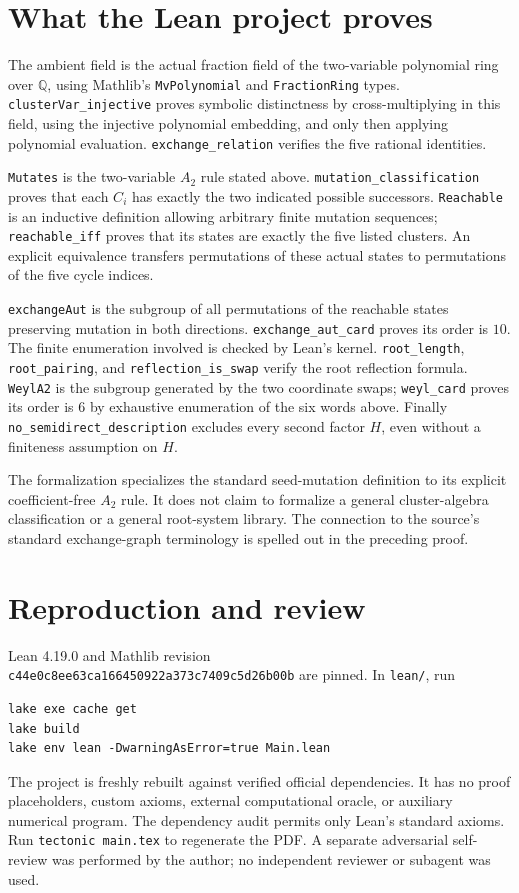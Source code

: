 \documentclass[11pt]{article}
\begin{document}
\newpage
\section*{What the Lean project proves}
The ambient field is the actual fraction field of the two-variable
polynomial ring over $\mathbb Q$, using Mathlib's
\texttt{MvPolynomial} and \texttt{FractionRing} types.
\texttt{clusterVar\_injective} proves symbolic distinctness by
cross-multiplying in this field, using the injective polynomial
embedding, and only then applying polynomial evaluation.
\texttt{exchange\_relation} verifies the five rational identities.

\texttt{Mutates} is the two-variable $A_2$ rule stated above.
\texttt{mutation\_classification} proves that each $C_i$ has exactly
the two indicated possible successors. \texttt{Reachable} is an
inductive definition allowing arbitrary finite mutation sequences;
\texttt{reachable\_iff} proves that its states are exactly the five
listed clusters. An explicit equivalence transfers permutations of
these actual states to permutations of the five cycle indices.

\texttt{exchangeAut} is the subgroup of all permutations of the
reachable states preserving mutation in both directions.
\texttt{exchange\_aut\_card} proves its order is $10$. The finite
enumeration involved is checked by Lean's kernel.
\texttt{root\_length}, \texttt{root\_pairing}, and
\texttt{reflection\_is\_swap} verify the root reflection formula.
\texttt{WeylA2} is the subgroup generated by the two coordinate swaps;
\texttt{weyl\_card} proves its order is $6$ by exhaustive enumeration
of the six words above. Finally
\texttt{no\_semidirect\_description} excludes every second factor
$H$, even without a finiteness assumption on $H$.

The formalization specializes the standard seed-mutation definition
to its explicit coefficient-free $A_2$ rule. It does not claim to
formalize a general cluster-algebra classification or a general
root-system library. The connection to the source's standard
exchange-graph terminology is spelled out in the preceding proof.

\section*{Reproduction and review}
Lean 4.19.0 and Mathlib revision\\
\texttt{c44e0c8ee63ca166450922a373c7409c5d26b00b} are pinned.
In \texttt{lean/}, run
\begin{verbatim}
lake exe cache get
lake build
lake env lean -DwarningAsError=true Main.lean
\end{verbatim}
The project is freshly rebuilt against verified official dependencies.
It has no proof placeholders, custom axioms, external computational
oracle, or auxiliary numerical program. The dependency audit permits
only Lean's standard axioms. Run \texttt{tectonic main.tex} to regenerate
the PDF. A separate adversarial self-review was performed by the author;
no independent reviewer or subagent was used.
\end{document}
